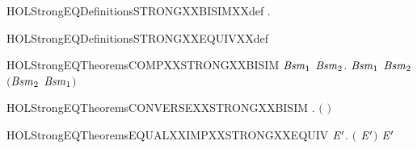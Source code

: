 \newcommand{\HOLStrongEQDate}{21 June 2020}
\newcommand{\HOLStrongEQTime}{18:11}
\begin{SaveVerbatim}{HOLStrongEQDefinitionsSTRONGXXBISIMXXdef}
\HOLTokenTurnstile{} \HOLSymConst{\HOLTokenForall{}}.   \HOLSymConst{\HOLTokenEquiv{}}   
\end{SaveVerbatim}
\newcommand{\HOLStrongEQDefinitionsSTRONGXXBISIMXXdef}{\UseVerbatim{HOLStrongEQDefinitionsSTRONGXXBISIMXXdef}}
\begin{SaveVerbatim}{HOLStrongEQDefinitionsSTRONGXXEQUIVXXdef}
\HOLTokenTurnstile{}  \HOLSymConst{\ensuremath{=}}  
\end{SaveVerbatim}
\newcommand{\HOLStrongEQDefinitionsSTRONGXXEQUIVXXdef}{\UseVerbatim{HOLStrongEQDefinitionsSTRONGXXEQUIVXXdef}}
\newcommand{\HOLStrongEQDefinitions}{
\HOLDfnTag{StrongEQ}{STRONG_BISIM_def}\HOLStrongEQDefinitionsSTRONGXXBISIMXXdef
\HOLDfnTag{StrongEQ}{STRONG_EQUIV_def}\HOLStrongEQDefinitionsSTRONGXXEQUIVXXdef
}
\begin{SaveVerbatim}{HOLStrongEQTheoremsCOMPXXSTRONGXXBISIM}
\HOLTokenTurnstile{} \HOLSymConst{\HOLTokenForall{}}\ensuremath{\HOLBoundVar{Bsm}\sb{\mathrm{1}}} \ensuremath{\HOLBoundVar{Bsm}\sb{\mathrm{2}}}.
        \ensuremath{\HOLBoundVar{Bsm}\sb{\mathrm{1}}} \HOLSymConst{\HOLTokenConj{}}  \ensuremath{\HOLBoundVar{Bsm}\sb{\mathrm{2}}} \HOLSymConst{\HOLTokenImp{}}
        \ensuremath{(}\ensuremath{\HOLBoundVar{Bsm}\sb{\mathrm{2}}}  \ensuremath{\HOLBoundVar{Bsm}\sb{\mathrm{1}}}\ensuremath{)}
\end{SaveVerbatim}
\newcommand{\HOLStrongEQTheoremsCOMPXXSTRONGXXBISIM}{\UseVerbatim{HOLStrongEQTheoremsCOMPXXSTRONGXXBISIM}}
\begin{SaveVerbatim}{HOLStrongEQTheoremsCONVERSEXXSTRONGXXBISIM}
\HOLTokenTurnstile{} \HOLSymConst{\HOLTokenForall{}}.   \HOLSymConst{\HOLTokenImp{}}  \ensuremath{(} \ensuremath{)}
\end{SaveVerbatim}
\newcommand{\HOLStrongEQTheoremsCONVERSEXXSTRONGXXBISIM}{\UseVerbatim{HOLStrongEQTheoremsCONVERSEXXSTRONGXXBISIM}}
\begin{SaveVerbatim}{HOLStrongEQTheoremsEQUALXXIMPXXSTRONGXXEQUIV}
\HOLTokenTurnstile{} \HOLSymConst{\HOLTokenForall{}} \ensuremath{\HOLBoundVar{E}\sp{\prime}}. \ensuremath{(} \HOLSymConst{\ensuremath{=}} \ensuremath{\HOLBoundVar{E}\sp{\prime}}\ensuremath{)} \HOLSymConst{\HOLTokenImp{}}   \ensuremath{\HOLBoundVar{E}\sp{\prime}}
\end{SaveVerbatim}
